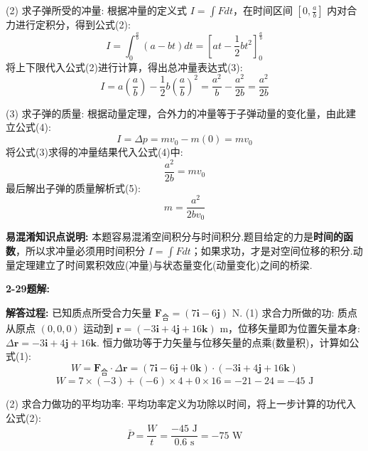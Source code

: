 (2) 求子弹所受的冲量:
根据冲量的定义式 $I = \int F dt$，在时间区间 $[0, \frac{a}{b}]$ 内对合力进行定积分，得到公式(2):
\begin{equation}
	I = \int_{0}^{\frac{a}{b}} (a - bt) dt = \left[ at - \frac{1}{2}bt^2 \right]_{0}^{\frac{a}{b}}
\end{equation}
将上下限代入公式(2)进行计算，得出总冲量表达式(3):
\begin{equation}
	I = a\left(\frac{a}{b}\right) - \frac{1}{2}b\left(\frac{a}{b}\right)^2 = \frac{a^2}{b} - \frac{a^2}{2b} = \frac{a^2}{2b}
\end{equation}

(3) 求子弹的质量:
根据动量定理，合外力的冲量等于子弹动量的变化量，由此建立公式(4):
\begin{equation}
	I = \Delta p = mv_0 - m(0) = mv_0
\end{equation}
将公式(3)求得的冲量结果代入公式(4)中:
$$\frac{a^2}{2b} = mv_0$$
最后解出子弹的质量解析式(5):
\begin{equation}
	m = \frac{a^2}{2bv_0}
\end{equation}

\textbf{易混淆知识点说明:}
本题容易混淆空间积分与时间积分.题目给定的力是\textbf{时间的函数}，所以求冲量必须用时间积分 $I = \int F dt$；如果求功，才是对空间位移的积分.动量定理建立了时间累积效应(冲量)与状态量变化(动量变化)之间的桥梁.

\vspace{2em}

\textbf{2-29题解:}


\textbf{解答过程:}
已知质点所受合力矢量 $\mathbf{F}_{\text{合}} = (7\mathbf{i} - 6\mathbf{j})\text{ N}$.
(1) 求合力所做的功:
质点从原点 $(0,0,0)$ 运动到 $\mathbf{r} = (-3\mathbf{i} + 4\mathbf{j} + 16\mathbf{k})\text{ m}$，位移矢量即为位置矢量本身:$\Delta\mathbf{r} = -3\mathbf{i} + 4\mathbf{j} + 16\mathbf{k}$.
恒力做功等于力矢量与位移矢量的点乘(数量积)，计算如公式(1):
\begin{equation}
	W = \mathbf{F}_{\text{合}} \cdot \Delta\mathbf{r} = (7\mathbf{i} - 6\mathbf{j} + 0\mathbf{k}) \cdot (-3\mathbf{i} + 4\mathbf{j} + 16\mathbf{k})
\end{equation}
$$W = 7 \times (-3) + (-6) \times 4 + 0 \times 16 = -21 - 24 = -45\text{ J}$$

(2) 求合力做功的平均功率:
平均功率定义为功除以时间，将上一步计算的功代入公式(2):
\begin{equation}
	\bar{P} = \frac{W}{t} = \frac{-45\text{ J}}{0.6\text{ s}} = -75\text{ W}
\end{equation}

